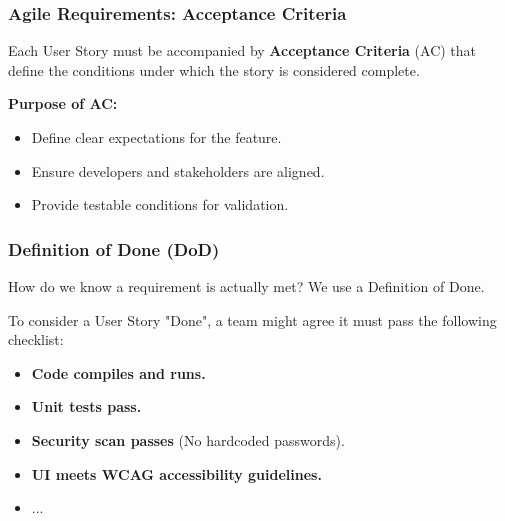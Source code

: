 \documentclass[xcolor=table]{beamer}
\begin{document}
\begin{frame}
    \frametitle{Agile Requirements: Acceptance Criteria}
    Each User Story must be accompanied by \textbf{Acceptance Criteria} (AC) that define the conditions under which the story is considered complete.
    
    \vspace{0.3cm}
    \textbf{Purpose of AC:}
    \begin{itemize}
        \item Define clear expectations for the feature.
        \item Ensure developers and stakeholders are aligned.
        \item Provide testable conditions for validation.
    \end{itemize}
\end{frame}

\begin{frame}
    \frametitle{Definition of Done (DoD)}
    How do we know a requirement is actually met? We use a Definition of Done. 
    
    \vspace{0.3cm}
    To consider a User Story "Done", a team might agree it must pass the following checklist:
    \begin{itemize}
        \item [$\square$] \textbf{Code compiles and runs.}
        \item [$\square$] \textbf{Unit tests pass.}
        \item [$\square$] \textbf{Security scan passes} (No hardcoded passwords).
        \item [$\square$] \textbf{UI meets WCAG accessibility guidelines.}
        \item [$\square$] ...
    \end{itemize}
\end{frame}
\end{document}
